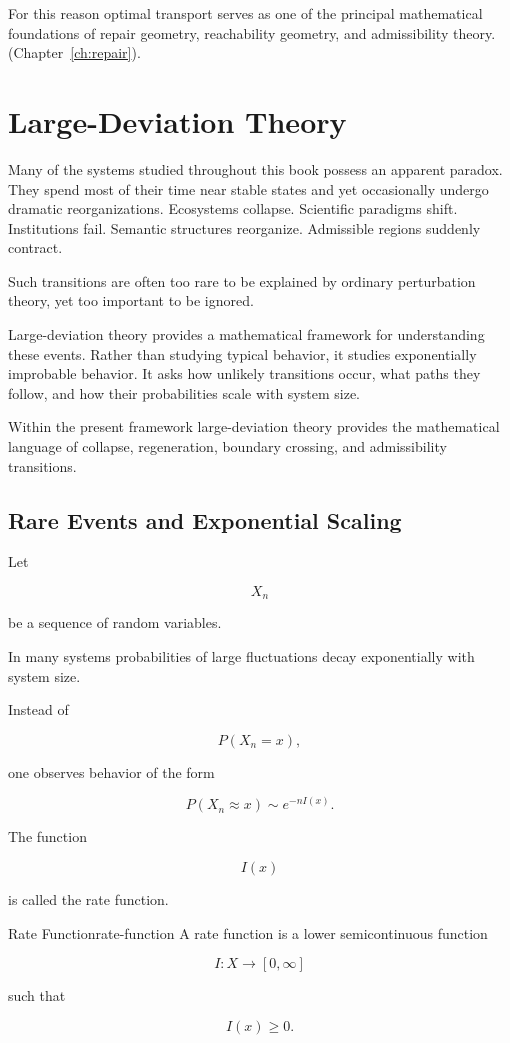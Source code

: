 \documentclass[12pt,twoside,openright]{book}
\begin{document}
For this reason optimal transport serves as one of the
principal mathematical foundations of repair geometry,
reachability geometry, and admissibility theory.
(Chapter~\ref{ch:repair}).

\section{Large-Deviation Theory}

Many of the systems studied throughout this book possess
an apparent paradox. They spend most of their time near
stable states and yet occasionally undergo dramatic
reorganizations. Ecosystems collapse. Scientific
paradigms shift. Institutions fail. Semantic structures
reorganize. Admissible regions suddenly contract.

Such transitions are often too rare to be explained by
ordinary perturbation theory, yet too important to be
ignored.

Large-deviation theory provides a mathematical framework
for understanding these events. Rather than studying
typical behavior, it studies exponentially improbable
behavior. It asks how unlikely transitions occur, what
paths they follow, and how their probabilities scale with
system size.

Within the present framework large-deviation theory
provides the mathematical language of collapse,
regeneration, boundary crossing, and admissibility
transitions.

\subsection{Rare Events and Exponential Scaling}

Let

\[
X_n
\]

be a sequence of random variables.

In many systems probabilities of large fluctuations decay
exponentially with system size.

Instead of

\[
P(X_n=x),
\]

one observes behavior of the form

\[
P(X_n\approx x)
\sim
e^{-nI(x)}.
\]

The function

\[
I(x)
\]

is called the rate function.

\begin{definition}{Rate Function}{rate-function}
A rate function is a lower semicontinuous function

\[
I:X\rightarrow[0,\infty]
\]

such that

\[
I(x)\ge0.
\]
\end{definition}
\end{document}
